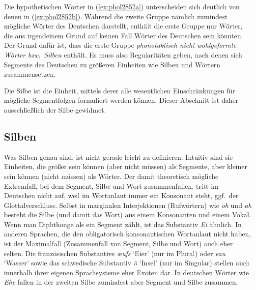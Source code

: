 Die hypothetischen Wörter in (\ref{ex:phol2852a}) unterscheiden sich deutlich von denen in (\ref{ex:phol2852b}).
Während die zweite Gruppe nämlich zumindest mögliche Wörter des Deutschen darstellt, enthält die erste Gruppe nur Wörter, die aus irgendeinem Grund auf keinen Fall Wörter des Deutschen sein könnten.
Der Grund dafür ist, dass die erste Gruppe \textit{phonotaktisch nicht wohlgeformte Wörter bzw.\ Silben} enthält.
Es muss also Regularitäten geben, nach denen sich Segmente des Deutschen zu größeren Einheiten wie Silben und Wörtern zusammensetzen.


Die Silbe ist die Einheit, mittels derer alle wesentlichen Einschränkungen für mögliche Segmentfolgen formuliert werden können.
Dieser Abschnitt ist daher ausschließlich der Silbe gewidmet.

\subsection{Silben}

\label{sec:silben}


Was Silben genau sind, ist nicht gerade leicht zu definieren.
Intuitiv sind sie Einheiten, die größer sein können (aber nicht müssen) als Segmente, aber kleiner sein können (nicht müssen) als Wörter.
Der damit theoretisch mögliche Extremfall, bei dem Segment, Silbe und Wort zusammenfallen, tritt im Deutschen nicht auf, weil im Wortanlaut immer ein Konsonant steht, ggf.\ der Glottalverschluss.
Selbst in marginalen Interjektionen (Rufwörtern) wie \textit{oh} \textipa{[Po:]} und \textit{ah} \textipa{[Pa:]} besteht die Silbe (und damit das Wort) aus einem Konsonanten und einem Vokal.
Wenn man Diphthonge als ein Segment zählt, ist das Substantiv \textit{Ei} \textipa{[P\t{aE}]} ähnlich.
In anderen Sprachen, die den obligatorisch konsonantischen Wortanlaut nicht haben, ist der Maximalfall (Zusammenfall von Segment, Silbe und Wort) auch eher selten.
Die französischen Substantive \textit{œufs} \textipa{[\o:]} `Eier' (nur im Plural) oder \textit{eau} \textipa{[o:]} `Wasser' sowie das schwedische Substantiv \textit{ö} \textipa{[\oe:]} `Insel' (nur im Singular) stellen auch innerhalb ihrer eigenen Sprachsysteme eher Exoten dar.
In deutschen Wörter wie \textit{Ehe} \textipa{[Pe:@]} fallen in der zweiten Silbe zumindest aber Segment und Silbe \textipa{[@]} zusammen.


